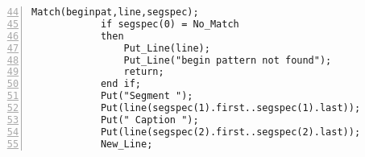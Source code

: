\lstset{language=Ada, caption=impl.adb: Begin recognition of the segment}
\begin{tcolorbox}[width=\linewidth, sharp corners=all, colback=white!95!black]
\begin{lstlisting}[frame=single, numbers=left, numbersep=5pt, firstnumber= 44]
            Match(beginpat,line,segspec);
            if segspec(0) = No_Match
            then
                Put_Line(line);
                Put_Line("begin pattern not found");
                return;
            end if;
            Put("Segment "); 
            Put(line(segspec(1).first..segspec(1).last));
            Put(" Caption "); 
            Put(line(segspec(2).first..segspec(2).last));
            New_Line;
\end{lstlisting}
\end{tcolorbox}
